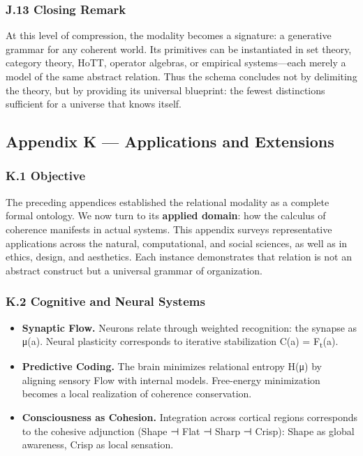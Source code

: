 \documentclass[11pt]{article}
\begin{document}
\subsubsection*{J.13 Closing Remark}
\label{sec:org75014f8}
At this level of compression, the modality becomes a signature:  
a generative grammar for any coherent world.  
Its primitives can be instantiated in set theory, category theory, HoTT,  
operator algebras, or empirical systems—each merely a model  
of the same abstract relation.  
Thus the schema concludes not by delimiting the theory,  
but by providing its universal blueprint:  
the fewest distinctions sufficient for a universe that knows itself.
\subsection*{Appendix K — Applications and Extensions}
\label{sec:org2078ee0}

\subsubsection*{K.1 Objective}
\label{sec:org3d2e891}
The preceding appendices established the relational modality as a complete formal ontology.  
We now turn to its \textbf{applied domain}: how the calculus of coherence manifests in actual systems.  
This appendix surveys representative applications across the natural, computational, and social sciences,  
as well as in ethics, design, and aesthetics.  
Each instance demonstrates that relation is not an abstract construct but a universal grammar of organization.
\subsubsection*{K.2 Cognitive and Neural Systems}
\label{sec:org8a1ba41}
\begin{itemize}
\item \textbf{\textbf{Synaptic Flow.}}  Neurons relate through weighted recognition: the synapse as μ(a).  
Neural plasticity corresponds to iterative stabilization C(a) = F\textsubscript{t}(a).
\item \textbf{\textbf{Predictive Coding.}}  The brain minimizes relational entropy H(μ) by aligning sensory Flow with internal models.  
Free-energy minimization becomes a local realization of coherence conservation.
\item \textbf{\textbf{Consciousness as Cohesion.}}  Integration across cortical regions corresponds to the cohesive adjunction  
(Shape ⊣ Flat ⊣ Sharp ⊣ Crisp): Shape as global awareness, Crisp as local sensation.
\end{itemize}
\end{document}
